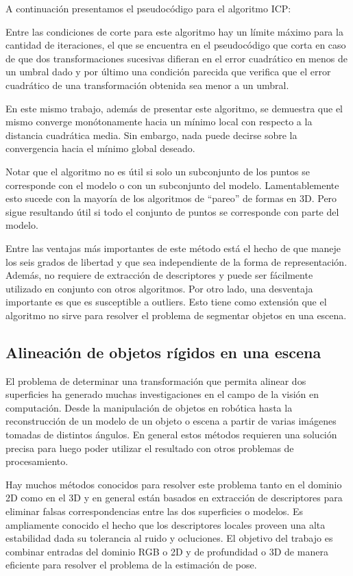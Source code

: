 A continuación presentamos el pseudocódigo para el algoritmo ICP:

\footnotesize

\normalsize

Entre las condiciones de corte para este algoritmo hay un límite máximo para la cantidad de iteraciones, el que se encuentra en el pseudocódigo que corta en caso de que dos transformaciones sucesivas difieran en el error cuadrático en menos de un umbral dado y por último una condición parecida que verifica que el error cuadrático de una transformación obtenida sea menor a un umbral.


En este mismo trabajo, además de presentar este algoritmo, se demuestra que el mismo converge monótonamente hacia un mínimo local con respecto a la distancia cuadrática media. Sin embargo, nada puede decirse sobre la convergencia hacia el mínimo global deseado.

Notar que el algoritmo no es útil si solo un subconjunto de los puntos se corresponde con el modelo o con un subconjunto del modelo. Lamentablemente esto sucede con la mayoría de los algoritmos de ``pareo'' de formas en 3D. Pero sigue resultando útil si todo el conjunto de puntos se corresponde con parte del modelo.

Entre las ventajas más importantes de este método está el hecho de que maneje los seis grados de libertad y que sea independiente de la forma de representación. Además, no requiere de extracción de descriptores y puede ser fácilmente utilizado en conjunto con otros algoritmos. Por otro lado, una desventaja importante es que es susceptible a outliers. Esto tiene como extensión que el algoritmo no sirve para resolver el problema de segmentar objetos en una escena.


\subsection{Alineación de objetos rígidos en una escena}\label{alignment_prerejective}
El problema de determinar una transformación que permita alinear dos superficies ha generado muchas investigaciones en el campo de la visión en computación. Desde la manipulación de objetos en robótica hasta la reconstrucción de un modelo de un objeto o escena a partir de varias imágenes tomadas de distintos ángulos. En general estos métodos requieren una solución precisa para luego poder utilizar el resultado con otros problemas de procesamiento.

Hay muchos métodos conocidos para resolver este problema tanto en el dominio 2D como en el 3D y en general están basados en extracción de descriptores para eliminar falsas correspondencias entre las dos superficies o modelos. Es ampliamente conocido el hecho que los descriptores locales proveen una alta estabilidad dada su tolerancia al ruido y ocluciones. El objetivo del trabajo \cite{6630856} es combinar entradas del dominio RGB o 2D y de profundidad o 3D de manera eficiente para resolver el problema de la estimación de pose.

